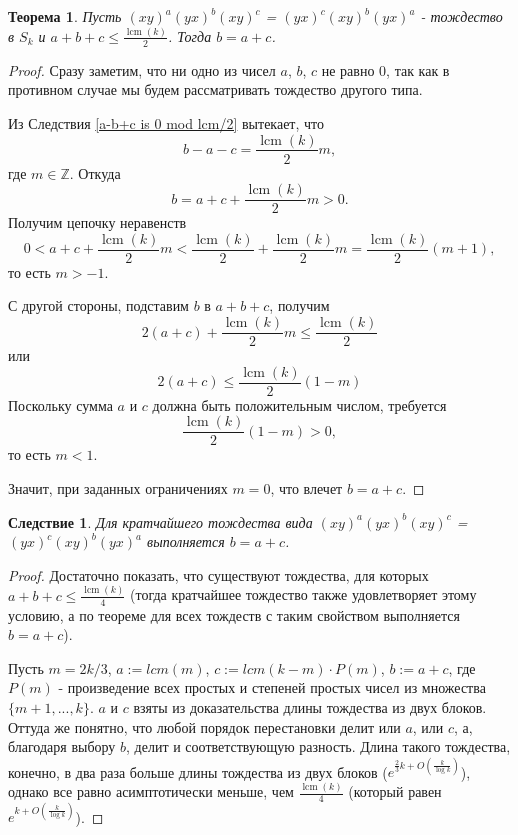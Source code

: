 \documentclass[12pt]{article}
\newtheorem{theorem}{Теорема}
\newtheorem{corollary}{Следствие}
\DeclareMathOperator{\lcm}{lcm}
\begin{document}
	\begin{theorem}
		Пусть $(xy)^a(yx)^b(xy)^c$ = $(yx)^c(xy)^b(yx)^a$ - тождество в $S_k$ и $a + b + c \le \frac{\lcm(k)}{2}$. Тогда $b = a+c$.
	\end{theorem}
	\begin{proof}
		Сразу заметим, что ни одно из чисел $a$, $b$, $c$ не равно 0, так как в противном случае мы будем рассматривать тождество другого типа.
		
		Из Следствия \ref{a-b+c is 0 mod lcm/2} вытекает, что \hspace{5pt} 
		$$
			b - a - c = \frac{\lcm(k)}{2}m,
		$$ где $m \in \mathbb{Z}$. 
		Откуда
		$$
			b = a + c + \frac{\lcm(k)}{2}m > 0.
		$$
		Получим цепочку неравенств 
		$$
			0 < a + c + \frac{\lcm(k)}{2}m < \frac{\lcm(k)}{2} + \frac{\lcm(k)}{2}m = \frac{\lcm(k)}{2}(m + 1),
		$$то есть $m > -1$.
		
		С другой стороны, подставим $b$ в $a+b+c$, получим
		$$
			2(a + c) + \frac{\lcm(k)}{2}m \le \frac{\lcm(k)}{2}
		$$ или 
		$$
			2(a + c) \le \frac{\lcm(k)}{2}(1-m)
		$$
		Поскольку сумма $a$ и $c$ должна быть положительным числом, требуется
		$$
			\frac{\lcm(k)}{2}(1-m) > 0,
		$$ то есть $m < 1$.
		
		Значит, при заданных ограничениях $m = 0$, что влечет $b = a + c$.
	\end{proof}

	\begin{corollary}
		Для кратчайшего тождества вида $(xy)^a(yx)^b(xy)^c$ = $(yx)^c(xy)^b(yx)^a$ выполняется $b = a + c$.
	\end{corollary}
	\begin{proof}
		Достаточно показать, что существуют тождества, для которых $a + b + c \le \frac{\lcm(k)}{4}$ (тогда кратчайшее тождество также удовлетворяет этому условию, а по теореме для всех тождеств с таким свойством выполняется $b = a + c$).
		
		Пусть $m = 2k/3$, $a := lcm(m)$, $c := lcm(k - m) \cdot P(m)$, $b := a+c$, где $P(m)$ - произведение всех простых и степеней простых чисел из множества $\{m+1, ..., k\}$. $a$ и $c$ взяты из доказательства длины тождества из двух блоков. Оттуда же понятно, что любой порядок перестановки делит или $a$, или $c$, а, благодаря выбору $b$, делит и соответствующую разность. Длина такого тождества, конечно, в два раза больше длины тождества из двух блоков ($e^{\frac{2}{3}k + O(\frac{k}{\log k})}$), однако все равно асимптотически меньше, чем $\frac{\lcm(k)}{4}$ (который  равен $e^{k + O(\frac{k}{\log k})}$).
	\end{proof}
\end{document}
